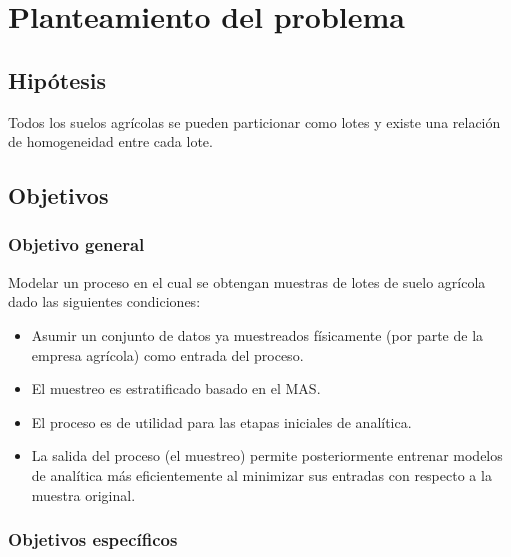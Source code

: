 \documentclass{report}
\begin{document}
\bigbreak

\chapter{Planteamiento del problema}

\section{Hipótesis}

Todos los suelos agrícolas se pueden particionar como lotes y existe una relación de homogeneidad entre cada lote.

\section{Objetivos}

\subsection{Objetivo general}

Modelar un proceso en el cual se obtengan muestras de lotes de suelo agrícola dado las siguientes condiciones:

\begin{itemize}
    \item Asumir un conjunto de datos ya muestreados físicamente (por parte de la empresa agrícola) como entrada del proceso.
    
    \item El muestreo es estratificado basado en el MAS.
    
    \item El proceso es de utilidad para las etapas iniciales de analítica.
    
    \item La salida del proceso (el muestreo) permite posteriormente entrenar modelos de analítica más eficientemente al minimizar sus entradas con respecto a la muestra original.
\end{itemize}

\subsection{Objetivos específicos}
\end{document}
